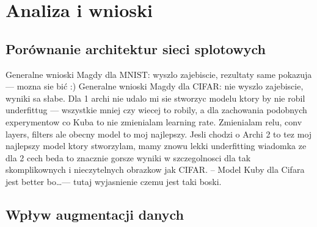 \documentclass[10pt]{article}
\begin{document}
\pagebreak
\section{Analiza i wnioski}\label{sec:wyniki}
\subsection*{Porównanie architektur sieci splotowych}
Generalne wnioski Magdy dla MNIST\@: wyszlo zajebiscie, rezultaty same pokazuja --- mozna sie bić :)
Generalne wnioski Magdy dla CIFAR\@: nie wyszlo zajebiscie, wyniki sa słabe. Dla 1 archi nie udalo mi sie stworzyc modelu ktory by nie robil underfittug --- wszystkie mniej czy wiecej to robily, a dla zachowania podobnych experymentow co Kuba to nie zmienialam learning rate. Zmienialam relu, conv layers, filters ale obecny model to moj najlepszy.
Jesli chodzi o Archi 2 to tez moj najlepszy model ktory stworzylam, mamy znowu lekki underfitting
wiadomka ze dla 2 cech beda to znacznie gorsze wyniki w szczegolnosci dla tak skomplikownych i nieczytelnych obrazkow jak CIFAR.
--
Model Kuby dla Cifara jest better bo\ldots --- tutaj wyjasnienie czemu jest taki boski.
\subsection*{Wpływ augmentacji danych}
\end{document}
